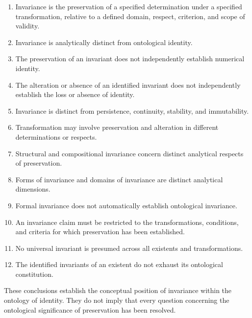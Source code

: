 \begin{enumerate}
    \item Invariance is the preservation of a specified
          determination under a specified transformation,
          relative to a defined domain, respect, criterion,
          and scope of validity.

    \item Invariance is analytically distinct from
          ontological identity.

    \item The preservation of an invariant does not
          independently establish numerical identity.

    \item The alteration or absence of an identified
          invariant does not independently establish
          the loss or absence of identity.

    \item Invariance is distinct from persistence,
          continuity, stability, and immutability.

    \item Transformation may involve preservation
          and alteration in different determinations
          or respects.

    \item Structural and compositional invariance
          concern distinct analytical respects of
          preservation.

    \item Forms of invariance and domains of invariance
          are distinct analytical dimensions.

    \item Formal invariance does not automatically
          establish ontological invariance.

    \item An invariance claim must be restricted to
          the transformations, conditions, and criteria
          for which preservation has been established.

    \item No universal invariant is presumed across
          all existents and transformations.

    \item The identified invariants of an existent
          do not exhaust its ontological constitution.
\end{enumerate}

These conclusions establish the conceptual position
of invariance within the ontology of identity. They
do not imply that every question concerning the
ontological significance of preservation has been
resolved.

